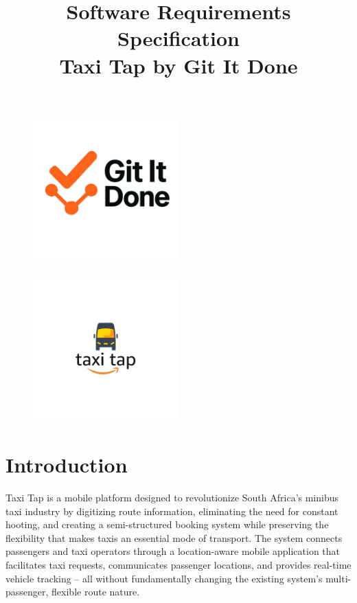 \documentclass[a4paper,12pt]{article}
\title{Software Requirements Specification\\Taxi Tap by Git It Done}
\date{}
\begin{document}
\maketitle

\begin{figure}[H]
  \centering
  \includegraphics[width=0.5\textwidth]{LogoGroup.png} 
\end{figure}

\begin{figure}[H]
  \centering
  \includegraphics[width=0.5\textwidth]{LogoTaxiTap.png} 
\end{figure}

\newpage

\tableofcontents
\newpage

\section{Introduction}
Taxi Tap is a mobile platform designed to revolutionize South Africa’s minibus taxi industry by digitizing route information, eliminating the need for constant hooting, and creating a semi-structured booking system while preserving the flexibility that makes taxis an essential mode of transport. The system connects passengers and taxi operators through a location-aware mobile application that facilitates taxi requests, communicates passenger locations, and provides real-time vehicle tracking – all without fundamentally changing the existing system's multi-passenger, flexible route nature.
\end{document}
